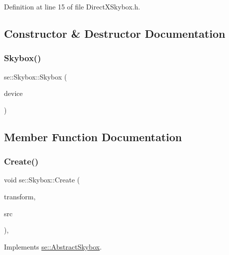 Definition at line 15 of file Direct\+X\+Skybox.\+h.



\subsection{Constructor \& Destructor Documentation}
\mbox{\label{classse_1_1_skybox_ab6b8fd8dbbf0251f32880d501bb892c3}} 
\subsubsection{\texorpdfstring{Skybox()}{Skybox()}}
{\footnotesize\ttfamily se\+::\+Skybox\+::\+Skybox (\begin{DoxyParamCaption}\item[{L\+P\+D\+I\+R\+E\+C\+T3\+D\+D\+E\+V\+I\+C\+E9}]{device }\end{DoxyParamCaption})}



\subsection{Member Function Documentation}
\mbox{\label{classse_1_1_skybox_a224bf849fd73b70f59613ebd572fd2ff}} 
\subsubsection{\texorpdfstring{Create()}{Create()}}
{\footnotesize\ttfamily void se\+::\+Skybox\+::\+Create (\begin{DoxyParamCaption}\item[{\mbox{\hyperlink{classse_1_1_transform3f}{Transform3f}}}]{transform,  }\item[{const std\+::string \&}]{src }\end{DoxyParamCaption})\hspace{0.3cm}{\ttfamily [override]}, {\ttfamily [virtual]}}



Implements \mbox{\hyperlink{classse_1_1_abstract_skybox_ad9c98023e2ae2cfbb6c84929a1b9f46b}{se\+::\+Abstract\+Skybox}}.

\mbox{\label{classse_1_1_skybox_acd2b0707c02b2a9ac48bcdd79608801c}} 
